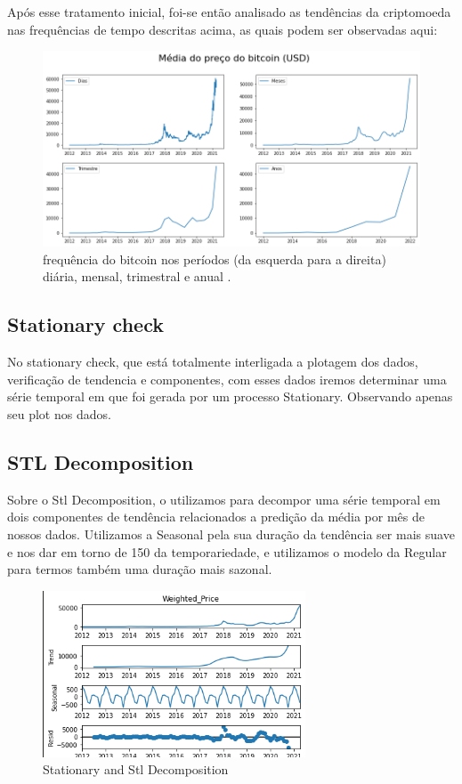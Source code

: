 \documentclass[sigplan,screen]{acmart}
\begin{document}
Após esse tratamento inicial, foi-se então analisado as tendências da criptomoeda nas frequências de tempo descritas acima, as quais podem ser observadas aqui:
\begin{figure}[h]
  \centering
  \includegraphics[width=\linewidth]{ibagens/Estudante.png}
  \caption{frequência do bitcoin nos períodos (da esquerda para a direita) diária, mensal, trimestral e anual .}
\end{figure}

\subsection{Stationary check}
No stationary check, que está totalmente interligada a plotagem dos dados, verificação de tendencia e componentes, com esses dados iremos determinar uma série temporal em que foi gerada por um processo Stationary.
Observando apenas seu plot nos dados.
\subsection{STL Decomposition}
Sobre o Stl Decomposition, o utilizamos para decompor uma série temporal em dois componentes de tendência relacionados a predição da média por mês de nossos dados.
Utilizamos a Seasonal pela sua duração da tendência ser mais suave e nos dar em torno de 150 da temporariedade, e utilizamos o modelo da Regular para termos também uma duração mais sazonal.
\begin{figure}[h]
  \centering
  \includegraphics[width=\linewidth]{ibagens/unknown.png}
  \caption{Stationary and Stl Decomposition}
\end{figure}
\end{document}
